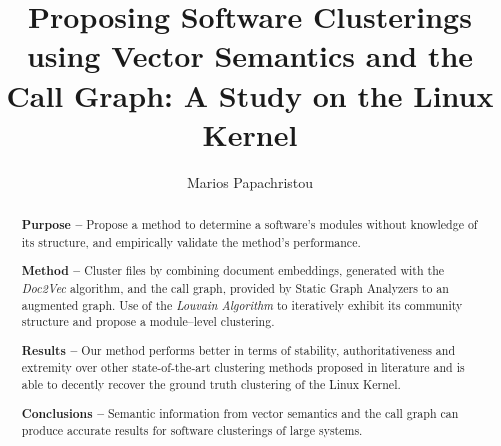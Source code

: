 \documentclass[sigconf,review, anonymous]{acmart}
\begin{document}
%
\title{Proposing Software Clusterings using Vector Semantics and the Call Graph: A Study on the Linux Kernel}

%
\author{Marios Papachristou}


%
\renewcommand{\shortauthors}{Papachristou}

\begin{abstract}

\noindent \textbf{Purpose -- } Propose a method to determine a software's modules without 
knowledge of its structure, and empirically validate the method's performance.

\noindent \textbf{Method -- } Cluster files by combining document embeddings, generated with the  \emph{Doc2Vec} algorithm, and the call graph, provided by Static Graph Analyzers to an augmented graph.
Use of the \emph{Louvain Algorithm} to iteratively exhibit its community structure and propose a module--level clustering. 


\noindent \textbf{Results --} Our method performs better in terms of stability, authoritativeness 
and extremity over other state-of-the-art clustering methods proposed in literature and is able to decently 
recover the ground truth clustering of the Linux Kernel. 

\noindent \textbf{Conclusions --} Semantic information from vector semantics and the call graph can produce 
accurate results for software clusterings of large systems.

\end{abstract}
\end{document}

